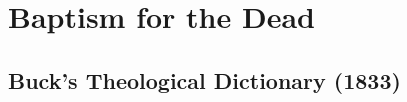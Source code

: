 \section{Baptism for the Dead}
	\label{BAPTISMDEAD}
	




	
\subsection{Buck's Theological Dictionary (1833)} %
	\label{BAPTISMDEAD-BTD}

